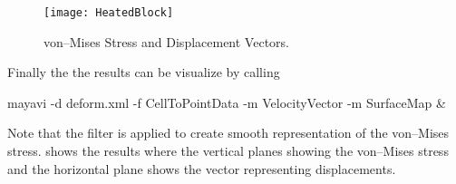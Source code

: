 \begin{figure}
\centerline{\texttt{[image: HeatedBlock]}}
\caption{von--Mises Stress and Displacement Vectors.}
\label{HEATEDBLOCK FIG 2}
\end{figure}

Finally the the results can be visualize by calling
\begin{python}
mayavi -d deform.xml -f CellToPointData -m VelocityVector -m SurfaceMap &
\end{python}
Note that the filter  is applied to create smooth representation of the 
von--Mises stress.  shows the results where the vertical planes showing the 
von--Mises stress and the horizontal plane shows the vector representing displacements.

